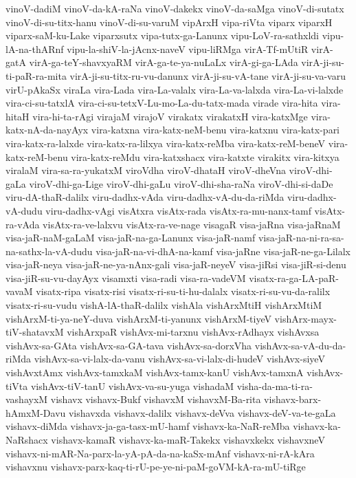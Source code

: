 {vinoV-dadiM
vinoV-da-kA-raNa
vinoV-dakekx
vinoV-da-saMga
vinoV-di-sutatx
vinoV-di-su-titx-hanu
vinoV-di-su-varuM
vipArxH
vipa-riVta
viparx
viparxH
viparx-saM-ku-Lake
viparxsutx
vipa-tutx-ga-Lanunx
vipu-LoV-ra-sathxldi
vipu-lA-na-thARnf
vipu-la-shiV-la-jAcnx-naveV
vipu-liRMga
virA-Tf-mUtiR
virA-gatA
virA-ga-teY-shavxyaRM
virA-ga-te-ya-nuLaLx
virA-gi-ga-LAda
virA-ji-su-ti-paR-ra-mita
virA-ji-su-titx-ru-vu-danunx
virA-ji-su-vA-tane
virA-ji-su-va-varu
virU-pAkaSx
viraLa
vira-Lada
vira-La-valalx
vira-La-va-lalxda
vira-La-vi-lalxde
vira-ci-su-tatxlA
vira-ci-su-tetxV-Lu-mo-La-du-tatx-mada
virade
vira-hita
vira-hitaH
vira-hi-ta-rAgi
virajaM
virajoV
virakatx
virakatxH
vira-katxMge
vira-katx-nA-da-nayAyx
vira-katxna
vira-katx-neM-benu
vira-katxnu
vira-katx-pari
vira-katx-ra-lalxde
vira-katx-ra-lilxya
vira-katx-reMba
vira-katx-reM-beneV
vira-katx-reM-benu
vira-katx-reMdu
vira-katxshacx
vira-katxte
virakitx
vira-kitxya
viralaM
vira-sa-ra-yukatxM
viroVdha
viroV-dhataH
viroV-dheVna
viroV-dhi-gaLa
viroV-dhi-ga-Lige
viroV-dhi-gaLu
viroV-dhi-sha-raNa
viroV-dhi-si-daDe
viru-dA-thaR-dalilx
viru-dadhx-vAda
viru-dadhx-vA-du-da-riMda
viru-dadhx-vA-dudu
viru-dadhx-vAgi
visAtxra
visAtx-rada
visAtx-ra-mu-nanx-tamf
visAtx-ra-vAda
visAtx-ra-ve-lalxvu
visAtx-ra-ve-nage
visagaR
visa-jaRna
visa-jaRnaM
visa-jaR-naM-gaLaM
visa-jaR-na-ga-Lanunx
visa-jaR-namf
visa-jaR-na-ni-ra-sa-na-sathx-la-vA-dudu
visa-jaR-na-vi-dhA-na-kamf
visa-jaRne
visa-jaR-ne-ga-Lilalx
visa-jaR-neya
visa-jaR-ne-ya-nAnx-gali
visa-jaR-neyeV
visa-jiRsi
visa-jiR-si-denu
visa-jiR-su-vu-dayAyx
visamxti
visa-radi
visa-ra-vadeVM
visatx-ra-ga-LA-paR-vavaM
visatx-ripa
visatx-risi
visatx-ri-su-ti-hu-dalalx
visatx-ri-su-vu-da-ralilx
visatx-ri-su-vudu
vishA-lA-thaR-dalilx
vishAla
vishArxMtiH
vishArxMtiM
vishArxM-ti-ya-neY-duva
vishArxM-ti-yanunx
vishArxM-tiyeV
vishArx-mayx-tiV-shatavxM
vishArxpaR
vishAvx-mi-tarxnu
vishAvx-rAdhayx
vishAvxsa
vishAvx-sa-GAta
vishAvx-sa-GA-tava
vishAvx-sa-dorxVha
vishAvx-sa-vA-du-da-riMda
vishAvx-sa-vi-lalx-da-vanu
vishAvx-sa-vi-lalx-di-hudeV
vishAvx-siyeV
vishAvxtAmx
vishAvx-tamxkaM
vishAvx-tamx-kanU
vishAvx-tamxnA
vishAvx-tiVta
vishAvx-tiV-tanU
vishAvx-va-su-yuga
vishadaM
visha-da-ma-ti-ra-vashayxM
vishavx
vishavx-Bukf
vishavxM
vishavxM-Ba-rita
vishavx-barx-hAmxM-Davu
vishavxda
vishavx-dalilx
vishavx-deVva
vishavx-deV-va-te-gaLa
vishavx-diMda
vishavx-ja-ga-tasx-mU-hamf
vishavx-ka-NaR-reMba
vishavx-ka-NaRshacx
vishavx-kamaR
vishavx-ka-maR-Takekx
vishavxkekx
vishavxneV
vishavx-ni-mAR-Na-parx-la-yA-pA-da-na-kaSx-mAnf
vishavx-ni-rA-kAra
vishavxnu
vishavx-parx-kaq-ti-rU-pe-ye-ni-paM-goVM-kA-ra-mU-tiRge
}
